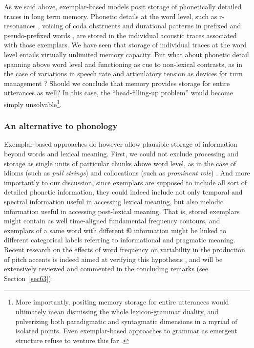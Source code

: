 As we said above, exemplar-based models posit storage of phonetically detailed traces in long term memory. Phonetic details at the word level, such as r-resonances \citep{heinrich2010influence}, voicing of coda obstruents  \citep{hawkins2004influence} and durational patterns in prefixed and pseudo-prefixed words \citep{smith2012phonetic}, are stored in the individual acoustic traces associated with those exemplars. We have seen that storage of individual traces at the word level entails virtually unlimited memory capacity. But what about phonetic detail spanning above word level and functioning as cue to non-lexical contrasts, as in the case of variations in speech rate and articulatory tension as devices for turn management \citep{local2003phonetics}? Should we conclude that memory provides storage for entire utterances as well? In this case, the ``head-filling-up problem'' \citep{johnson1997speech} would become simply unsolvable\footnote{More importantly, positing memory storage for entire utterances would ultimately mean dismissing the whole lexicon-grammar duality, and pulverizing both paradigmatic and syntagmatic dimensions in a myriad of isolated points. Even exemplar-based approaches to grammar as emergent structure refuse to venture this far \citep{bybee2001phonology}.}.

\subsubsection{An alternative to phonology}\label{sec1131}
Exemplar-based approaches do however allow plausible storage of information beyond words and lexical meaning. First, we could not exclude processing and storage as single units of particular chunks above word level, as in the case of idioms (such as \textit{pull strings}) and collocations (such as \textit{prominent role}) \citep{bybee2006usage}. And more importantly to our discussion, since exemplars are supposed to include all sort of detailed phonetic information, they could indeed include not only temporal and spectral information useful in accessing lexical meaning, but also melodic information useful in accessing post-lexical meaning. That is, stored exemplars might contain as well time-aligned fundamental frequency contours, and exemplars of a same word with different f0 information might be linked to different categorical labels referring to informational and pragmatic meaning. Recent research on the effects of word frequency on variability in the production of pitch accents is indeed aimed at verifying this hypothesis \citep{walsh2008examining,schweitzer2009frequency,schweitzer2010frequency}, and will be extensively reviewed and commented in the concluding remarks (see Section~\ref{sec63}). 

